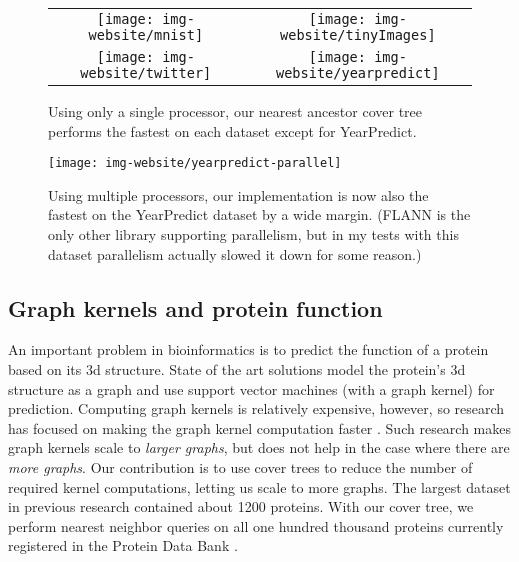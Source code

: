 \documentclass[thesis.tex]{subfiles}
\begin{document}
\begin{figure}
    \begin{tabular}{cc}
    \texttt{[image: img-website/mnist]}
    &
    \texttt{[image: img-website/tinyImages]}
    \\
    \texttt{[image: img-website/twitter]}
    &
    \texttt{[image: img-website/yearpredict]}
    \end{tabular}
    \caption{
Using only a single processor, 
our nearest ancestor cover tree performs the fastest on each dataset except for YearPredict.
    }
    \label{fig:allexp1}
\end{figure}

\begin{figure}
    \centering
    \texttt{[image: img-website/yearpredict-parallel]}
    \caption{
        Using multiple processors, 
        our implementation is now also the fastest on the YearPredict dataset by a wide margin.
        (FLANN is the only other library supporting parallelism, 
        but in my tests with this dataset parallelism actually slowed it down for some reason.)
    }
    \label{fig:allexp2}
\end{figure}


\subsection{Graph kernels and protein function}

An important problem in bioinformatics is to predict the function of a protein based on its 3d structure.
State of the art solutions model the protein's 3d structure as a graph and use support vector machines (with a graph kernel) for prediction.
Computing graph kernels is relatively expensive, however, so research has focused on making the graph kernel computation faster \citep{Vishwanathan2010,Shervashidze2011}.
Such research makes graph kernels scale to \emph{larger graphs}, but does not help in the case where there are \emph{more graphs}.
Our contribution is to use cover trees to reduce the number of required kernel computations, letting us scale to more graphs.
The largest dataset in previous research contained about 1200 proteins.
With our cover tree, we perform nearest neighbor queries on all one hundred thousand proteins currently registered in the Protein Data Bank \citep{Berman2000}.
\end{document}
